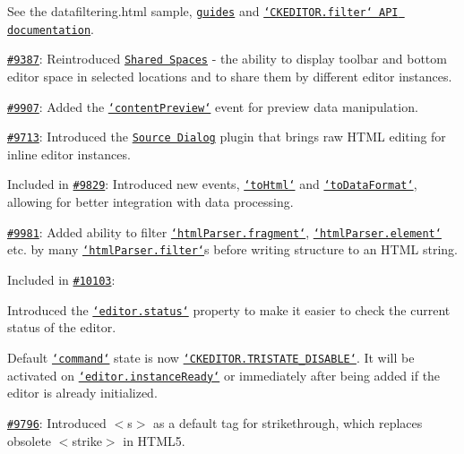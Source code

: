 \begin{DoxyItemize}
See the {\ttfamily datafiltering.\-html} sample, \href{http://docs.ckeditor.com/#!/guide/dev_advanced_content_filter}{\tt guides} and \href{http://docs.ckeditor.com/#!/api/CKEDITOR.filter}{\tt `\-C\-K\-E\-D\-I\-T\-O\-R.filter` A\-P\-I documentation}.
\item \href{http://dev.ckeditor.com/ticket/9387}{\tt \#9387}\-: Reintroduced \href{http://ckeditor.com/addon/sharedspace}{\tt Shared Spaces} -\/ the ability to display toolbar and bottom editor space in selected locations and to share them by different editor instances.
\item \href{http://dev.ckeditor.com/ticket/9907}{\tt \#9907}\-: Added the \href{http://docs.ckeditor.com/#!/api/CKEDITOR-event-contentPreview}{\tt `content\-Preview`} event for preview data manipulation.
\item \href{http://dev.ckeditor.com/ticket/9713}{\tt \#9713}\-: Introduced the \href{http://ckeditor.com/addon/sourcedialog}{\tt Source Dialog} plugin that brings raw H\-T\-M\-L editing for inline editor instances.
\item Included in \href{http://dev.ckeditor.com/ticket/9829}{\tt \#9829}\-: Introduced new events, \href{http://docs.ckeditor.com/#!/api/CKEDITOR.editor-event-toHtml}{\tt `to\-Html`} and \href{http://docs.ckeditor.com/#!/api/CKEDITOR.editor-event-toDataFormat}{\tt `to\-Data\-Format`}, allowing for better integration with data processing.
\item \href{http://dev.ckeditor.com/ticket/9981}{\tt \#9981}\-: Added ability to filter \href{http://docs.ckeditor.com/#!/api/CKEDITOR.htmlParser.fragment}{\tt `html\-Parser.fragment`}, \href{http://docs.ckeditor.com/#!/api/CKEDITOR.htmlParser.element}{\tt `html\-Parser.element`} etc. by many \href{http://docs.ckeditor.com/#!/api/CKEDITOR.htmlParser.filter}{\tt `html\-Parser.filter`}s before writing structure to an H\-T\-M\-L string.
\item Included in \href{http://dev.ckeditor.com/ticket/10103}{\tt \#10103}\-:
\begin{DoxyItemize}
\item Introduced the \href{http://docs.ckeditor.com/#!/api/CKEDITOR.editor-property-status}{\tt `editor.status`} property to make it easier to check the current status of the editor.
\item Default \href{http://docs.ckeditor.com/#!/api/CKEDITOR.command}{\tt `command`} state is now \href{http://docs.ckeditor.com/#!/api/CKEDITOR-property-TRISTATE_DISABLED}{\tt `\-C\-K\-E\-D\-I\-T\-O\-R.T\-R\-I\-S\-T\-A\-T\-E\-\_\-\-D\-I\-S\-A\-B\-L\-E`}. It will be activated on \href{http://docs.ckeditor.com/#!/api/CKEDITOR-event-instanceReady}{\tt `editor.instance\-Ready`} or immediately after being added if the editor is already initialized.
\end{DoxyItemize}
\item \href{http://dev.ckeditor.com/ticket/9796}{\tt \#9796}\-: Introduced {\ttfamily $<$s$>$} as a default tag for strikethrough, which replaces obsolete {\ttfamily $<$strike$>$} in H\-T\-M\-L5.
\end{DoxyItemize}

